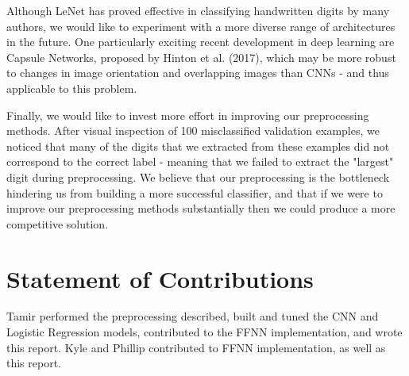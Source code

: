\documentclass[letterpaper, 10 pt, conference]{ieeeconf}  %
\begin{document}
Although LeNet has proved effective in classifying handwritten digits by many authors, we would like to experiment with a more diverse range of architectures in the future. One particularly exciting recent development in deep learning are Capsule Networks, proposed by Hinton et al. (2017), which may be more robust to changes in image orientation and overlapping images than CNNs - and thus applicable to this problem. 

Finally, we would like to invest more effort in improving our preprocessing methods. After visual inspection of 100 misclassified validation examples, we noticed that many of the digits that we extracted from these examples did not correspond to the correct label - meaning that we failed to extract the "largest" digit during preprocessing. We believe that our preprocessing is the bottleneck hindering us from building a more successful classifier, and that if we were to improve our preprocessing methods substantially then we could produce a more competitive solution. 

\section{Statement of Contributions}

Tamir performed the preprocessing described, built and tuned the CNN and Logistic Regression models, contributed to the FFNN implementation, and wrote this report. Kyle and Phillip contributed to FFNN implementation, as well as this report.

\addtolength{\textheight}{-12cm}   %







\end{document}
